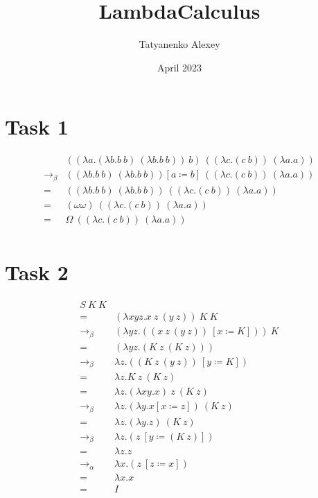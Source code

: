 \documentclass{article}
\title{LambdaCalculus}
\author{Tatyanenko Alexey}
\date{April 2023}
\begin{document}
    \section{Task 1}
    \begin{align*}
            & ((\lambda a.(\lambda b.b\ b)\ (\lambda b.b\ b))\ b)\ ((\lambda c.(c\ b))\ (\lambda a.a)) \\
            \to_\beta{} & ((\lambda b.b\ b)\ (\lambda b.b\ b))[a \coloneq b]\ ((\lambda c.(c\ b))\ (\lambda a.a)) \\
            ={}         & ((\lambda b.b\ b)\ (\lambda b.b\ b))\ ((\lambda c.(c\ b))\ (\lambda a.a)) \\
            ={} & (\omega \omega)\ ((\lambda c.(c\ b))\ (\lambda a.a)) \\
            ={} & \Omega\ ((\lambda c.(c\ b))\ (\lambda a.a)) \\
    \end{align*}
    \section{Task 2}
    \sloppy
    \begin{align*}
        S\ K\ K\\
        ={} & (\lambda xyz.x\ z\ (y\ z))\ K\ K \\
        \to_\beta & (\lambda yz.((x\ z\ (y\ z))\ [x \coloneq K]))\ K \\
        ={} & (\lambda yz.(K\ z\ (K\ z))) \\
        \to_\beta & \lambda z.((K\ z\ (y\ z))\ [y \coloneq K]) \\
        ={} & \lambda z.K\ z\ (K\ z) \\
        ={} & \lambda z.(\lambda xy.x)\ z\ (K\ z) \\
        \to_\beta & \lambda z.(\lambda y.x [x \coloneq z])\ (K\ z) \\
        ={} & \lambda z.(\lambda y.z)\ (K\ z) \\
        \to_\beta & \lambda z.(z\ [y \coloneq (K\ z)]) \\
        ={} & \lambda z.z \\
        \to_\alpha & \lambda x.(z\ [z \coloneq x]) \\
        ={} & \lambda x.x \\
        ={} & I
    \end{align*}
\end{document}
